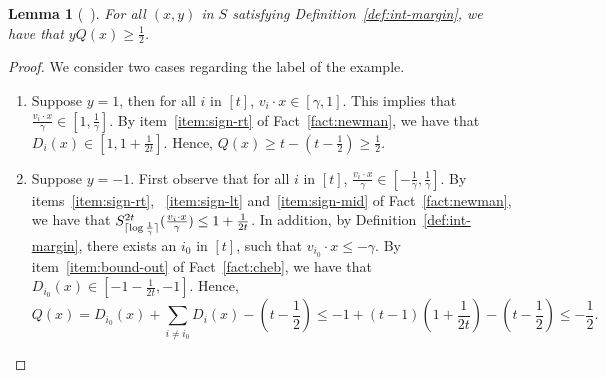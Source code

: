 \documentclass{article}
\DeclarePairedDelimiter\ceil{\lceil}{\rceil}
\newtheorem{lemma}[theorem]{Lemma}
\begin{document}
\begin{lemma}[~\cite{klivans2004learning}]
For all $(x,y)$ in $S$ satisfying Definition~\ref{def:int-margin}, we have that $y Q(x) \geq \frac 1 2$.
\end{lemma}
\begin{proof}
We consider two cases regarding the label of the example.
\begin{enumerate}
\item Suppose $y = 1$, then for all $i$ in $[t]$, $v_i \cdot x \in [\gamma, 1]$. This implies that $\frac{v_i \cdot x}{\gamma} \in [1, \frac 1 \gamma]$.
By item~\ref{item:sign-rt} of Fact~\ref{fact:newman}, we have that $D_i(x) \in [1, 1+ \frac 1 {2t}]$.
Hence, $Q(x) \geq t - (t - \frac 1 2) \geq \frac 1 2$.

\item Suppose $y = -1$. First observe that for all $i$ in $[t]$, $\frac{v_i \cdot x}{\gamma} \in [-\frac 1\gamma, \frac 1 \gamma]$. By items~\ref{item:sign-rt},
~\ref{item:sign-lt} and~\ref{item:sign-mid} of Fact~\ref{fact:newman}, we have that $S_{\ceil{\log \frac 1 \gamma}}^{2t}(\frac{v_i \cdot x}{\gamma}) \leq 1+ \frac 1 {2t}$.
In addition, by Definition~\ref{def:int-margin}, there exists an $i_0$ in $[t]$, such that $v_{i_0} \cdot x \leq -\gamma$.
By item~\ref{item:bound-out} of Fact~\ref{fact:cheb}, we have that
$D_{i_0}(x) \in [-1 - \frac 1 {2t}, -1]$.
Hence,
\[ Q(x) = D_{i_0}(x) + \sum_{i \neq i_0} D_i(x) - (t - \frac 1 2)
\leq -1 + (t-1)(1 + \frac 1 {2t}) - (t - \frac 1 2) \leq - \frac 1 2. \]


\end{enumerate}
\end{proof}
\end{document}
